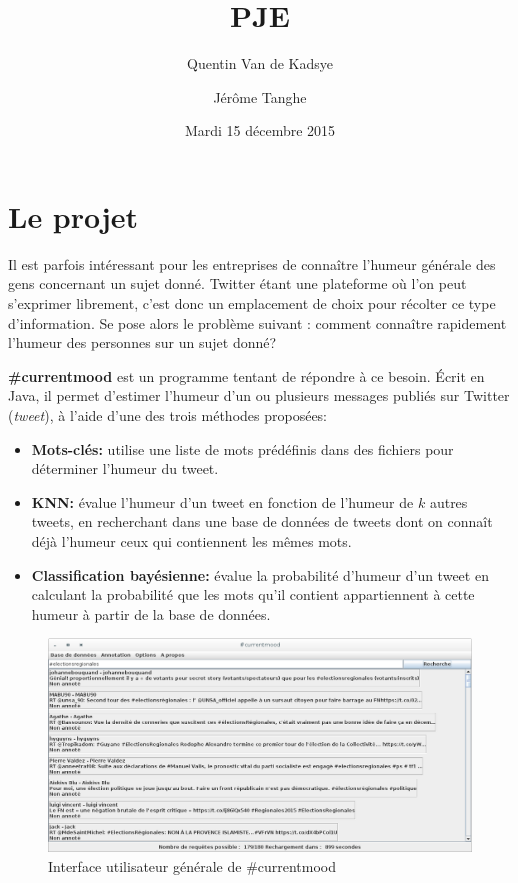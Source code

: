 \documentclass[12pt,a4paper]{report}
\title{PJE\\\CMName}
\author{Quentin Van de Kadsye \and Jérôme Tanghe}
\date{Mardi 15 décembre 2015}
\newcommand{\CMName}{\#currentmood}
\begin{document}
\maketitle

\tableofcontents


\chapter{Le projet}

Il est parfois intéressant pour les entreprises de connaître l'humeur générale
des gens concernant un sujet donné. Twitter étant une plateforme où l'on peut
s'exprimer librement, c'est donc un emplacement de choix pour récolter ce type
d'information. Se pose alors le problème suivant : comment connaître rapidement
l'humeur des personnes sur un sujet donné?

\textbf{\CMName} est un programme tentant de répondre à ce besoin. Écrit
en Java, il permet d'estimer l'humeur d'un ou plusieurs messages publiés sur
Twitter (\textit{tweet}), à l'aide d'une des trois méthodes proposées:

\begin{itemize}
    \item
        \textbf{Mots-clés:} utilise une liste de mots prédéfinis dans des
        fichiers pour déterminer l'humeur du tweet.
    \item
        \textbf{KNN:} évalue l'humeur d'un tweet en fonction de l'humeur de $k$
        autres tweets, en recherchant dans une base de données de tweets dont on
        connaît déjà l'humeur ceux qui contiennent les mêmes mots.
    \item
        \textbf{Classification bayésienne:} évalue la probabilité d'humeur d'un
        tweet en calculant la probabilité que les mots qu'il contient
        appartiennent à cette humeur à partir de la base de données.
\end{itemize}

\begin{figure}[h]
	\includegraphics[width=\textwidth]{img/capture-currentmood-ui.png}
	\caption{Interface utilisateur générale de \CMName}
	\label{cm_ui}
\end{figure}
\end{document}
